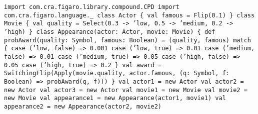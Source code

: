\begin{flushleft}
\texttt{import com.cra.figaro.library.compound.CPD
\newline import com.cra.figaro.language.\_
\newline
\newline class Actor \{
\newline \tab val famous = Flip(0.1)
\newline \}
\newline
\newline class Movie \{
\newline \tab val quality = Select(0.3 -> 'low, 0.5 -> 'medium, 0.2 -> 'high)
\newline \}
\newline
{}
\newline class Appearance(actor: Actor, movie: Movie) \{
\newline \tab def probAward(quality: Symbol, famous: Boolean) = 
\newline \tab  \tab  (quality, famous) match \{ 
\newline \tab \tab  case ('low, false) => 0.001
\newline \tab \tab  case ('low, true) => 0.01 
\newline \tab \tab  case ('medium, false) => 0.01
\newline \tab \tab  case ('medium, true) => 0.05
\newline \tab \tab  case ('high, false) => 0.05
\newline \tab \tab  case ('high, true) => 0.2
\newline \tab \tab \}
\newline \tab  val award = SwitchingFlip(Apply(movie.quality, actor.famous, (q: Symbol, f: Boolean) => probAward(q, f)))
\newline \}
\newline
\newline val actor1 = new Actor 
\newline val actor2 = new Actor 
\newline val actor3 = new Actor 
\newline val movie1 = new Movie 
\newline val movie2 = new Movie
\newline val appearance1 = new Appearance(actor1, movie1) 
\newline val appearance2 = new Appearance(actor2, movie2) 
}
\end{flushleft}
